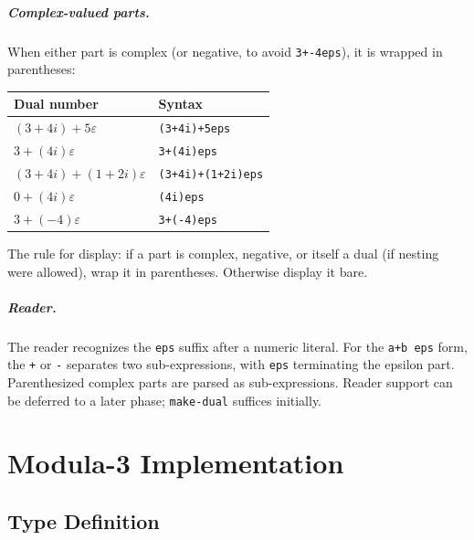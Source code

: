 \documentclass[12pt]{report}
\begin{document}
\paragraph{Complex-valued parts.}
When either part is complex (or negative, to avoid {\tt 3+-4eps}),
it is wrapped in parentheses:

\begin{center}
\begin{tabular}{ll}
\toprule
Dual number & Syntax \\
\midrule
$(3+4i) + 5\varepsilon$         & {\tt (3+4i)+5eps} \\
$3 + (4i)\varepsilon$           & {\tt 3+(4i)eps} \\
$(3+4i) + (1+2i)\varepsilon$    & {\tt (3+4i)+(1+2i)eps} \\
$0 + (4i)\varepsilon$           & {\tt (4i)eps} \\
$3 + (-4)\varepsilon$           & {\tt 3+(-4)eps} \\
\bottomrule
\end{tabular}
\end{center}

\noindent The rule for display: if a part is complex, negative, or
itself a dual (if nesting were allowed), wrap it in parentheses.
Otherwise display it bare.

\paragraph{Reader.}
The reader recognizes the {\tt eps} suffix after a numeric literal.
For the {\tt a+b\,eps} form, the {\tt +} or {\tt -} separates two
sub-expressions, with {\tt eps} terminating the epsilon part.
Parenthesized complex parts are parsed as sub-expressions.
Reader support can be deferred to a later phase; {\tt make-dual}
suffices initially.

\chapter{Modula-3 Implementation}

\section{Type Definition}
\end{document}
